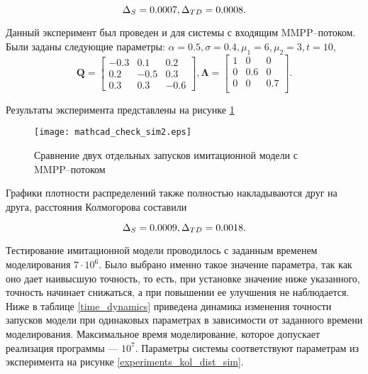 \begin{equation*}
	\Delta_S = 0.0007,\\
	\Delta_{TD} = 0.0008.
\end{equation*}

Данный эксперимент был проведен и для системы с входящим MMPP--потоком. Были заданы следующие параметры: $\alpha = 0.5, \sigma = 0.4, \mu_{1} = 6, \mu_{2} = 3, t = 10 $,
\begin{equation*}
	\boldsymbol{Q}=\begin{bmatrix}
		-0.3 &  0.1 &  0.2\\
		0.2 & -0.5 &  0.3\\
		0.3 &  0.3 &  -0.6
	\end{bmatrix},
	\boldsymbol{\Lambda}=\begin{bmatrix}
		1 &	0 & 0\\
		0 &	0.6 & 0\\
		0 &	0 & 0.7\\
	\end{bmatrix}.
\end{equation*}

Результаты эксперимента представлены на рисунке \ref{experiments_kol_dist_sim2}

\begin{figure}[H]
	\centering
	\texttt{[image: mathcad\_check\_sim2.eps]}
	\caption{Сравнение двух отдельных запусков имитационной модели с MMPP--потоком}
	\label{experiments_kol_dist_sim2}
\end{figure} 

Графики плотности распределений также полностью накладываются друг на друга, расстояния Колмогорова составили

\begin{equation*}
	\Delta_S = 0.0009,\\
	\Delta_{TD} = 0.0018.
\end{equation*}

Тестирование имитационной модели проводилось с заданным временем моделирования $7\cdot 10^6$. Было выбрано именно такое значение параметра, так как оно дает наивысшую точность, то есть, при установке значение ниже указанного, точность начинает снижаться, а при повышении ее улучшения не наблюдается. Ниже в таблице \ref{time_dynamics} приведена динамика изменения точности запусков модели при одинаковых параметрах в зависимости от заданного времени моделирования. Максимальное время моделирование, которое допускает реализация программы --- $10^7$. Параметры системы соответствуют параметрам из эксперимента на рисунке \ref{experiments_kol_dist_sim}.


